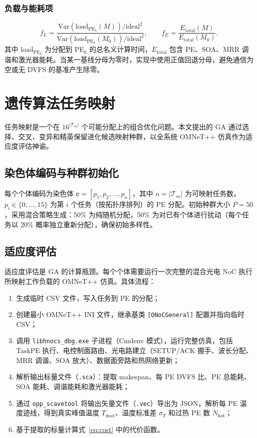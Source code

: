 \documentclass[conference]{IEEEtran}
\begin{document}
\subsubsection{负载与能耗项}
\begin{equation}
f_L = \frac{\text{Var}(\text{load}_{\text{PE}_k}(M))/\text{ideal}^2}
{\text{Var}(\text{load}_{\text{PE}_k}(M_0))/\text{ideal}^2}, \qquad
f_E = \frac{E_{\text{total}}(M)}{E_{\text{total}}(M_0)} .
\end{equation}
其中 $\text{load}_{\text{PE}_k}$ 为分配到 PE$_k$ 的总名义计算时间，$E_{\text{total}}$ 包含 PE、SOA、MRR 调谐和激光器能耗。当某一基线分母为零时，实现中使用正值回退分母，避免通信为空或无 DVFS 的基准产生除零。

\section{遗传算法任务映射}

任务映射是一个在 $16^{|\mathcal{T}_m|}$ 个可能分配上的组合优化问题。本文提出的 GA 通过选择、交叉、变异和精英保留进化候选映射种群，以全系统 OMNeT++ 仿真作为适应度评估神谕。

\subsection{染色体编码与种群初始化}

每个个体编码为染色体 $\mathbf{c} = [p_1, p_2, \ldots, p_n]$，其中 $n = |\mathcal{T}_m|$ 为可映射任务数，$p_i \in \{0,\ldots,15\}$ 为第 $i$ 个任务（按拓扑序排列）的 PE 分配。初始种群大小 $P = 50$，采用混合策略生成：50\% 为纯随机分配，50\% 为对已有个体进行扰动（每个任务以 20\% 概率独立重新分配），确保初始多样性。

\subsection{适应度评估}

适应度评估是 GA 的计算瓶颈。每个个体需要运行一次完整的混合光电 NoC 执行所映射工作负载的 OMNeT++ 仿真。具体流程：

\begin{enumerate}
\item 生成临时 CSV 文件，写入任务到 PE 的分配；
\item 创建最小 OMNeT++ INI 文件，继承基类 \texttt{[ONoCGeneral]} 配置并指向临时 CSV；
\item 调用 \texttt{libhnocs\_dbg.exe} 子进程（Cmdenv 模式），运行完整仿真，包括 TaskPE 执行、电控制面路由、光电路建立（SETUP/ACK 握手、波长分配、MRR 调谐、SOA 放大）、数据面旁路和热网络更新；
\item 解析输出标量文件（\texttt{.sca}）：提取 makespan、每 PE DVFS 比、PE 总能耗、SOA 能耗、调谐能耗和激光器能耗；
\item 通过 \texttt{opp\_scavetool} 将输出矢量文件（\texttt{.vec}）导出为 JSON，解析每 PE 温度迹线，得到真实峰值温度 $T_{\max}$、温度标准差 $\sigma_T$ 和过热 PE 数 $N_{\text{hot}}$；
\item 基于提取的标量计算式~\eqref{eq:cost} 中的代价函数。
\end{enumerate}
\end{document}

